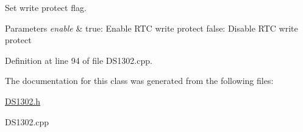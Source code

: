 Set write protect flag. 


\begin{DoxyParams}{Parameters}
{\em enable} & true\+: Enable R\+TC write protect false\+: Disable R\+TC write protect \\
\hline
\end{DoxyParams}


Definition at line 94 of file D\+S1302.\+cpp.



The documentation for this class was generated from the following files\+:\begin{DoxyCompactItemize}
\item 
\hyperlink{_d_s1302_8h}{D\+S1302.\+h}\item 
D\+S1302.\+cpp\end{DoxyCompactItemize}
